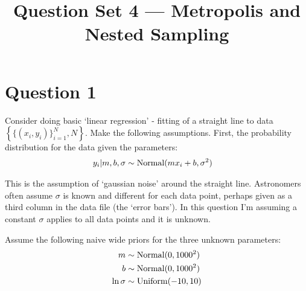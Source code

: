 \documentclass[a4paper, 12pt]{article}
\title{Question Set 4 --- Metropolis and Nested Sampling}
\author{}
\date{}
\begin{document}
\maketitle


\setlength{\parindent}{0pt}
\setlength{\parskip}{8pt}

\section*{Question 1}
Consider doing basic `linear regression' - fitting of a straight line to data
$\left\{\{(x_i, y_i)\}_{i=1}^N, N\right\}$.
Make the following assumptions. First, the probability distribution for the
data given the parameters:
\begin{align}
y_i | m, b, \sigma &\sim \textnormal{Normal}(mx_i + b, \sigma^2)
\end{align}

This is the assumption of `gaussian noise' around the straight line. Astronomers
often assume $\sigma$ is known and different for each data point, perhaps given
as a third column in the data file (the `error bars'). In this question I'm
assuming a constant $\sigma$ applies to all data points and it is unknown.

Assume the following naive wide priors for the three unknown parameters:
\begin{align}
m &\sim \textnormal{Normal}(0, 1000^2) \\
b &\sim \textnormal{Normal}(0, 1000^2) \\
\ln\sigma &\sim \textnormal{Uniform}(-10, 10)
\end{align}
\end{document}
